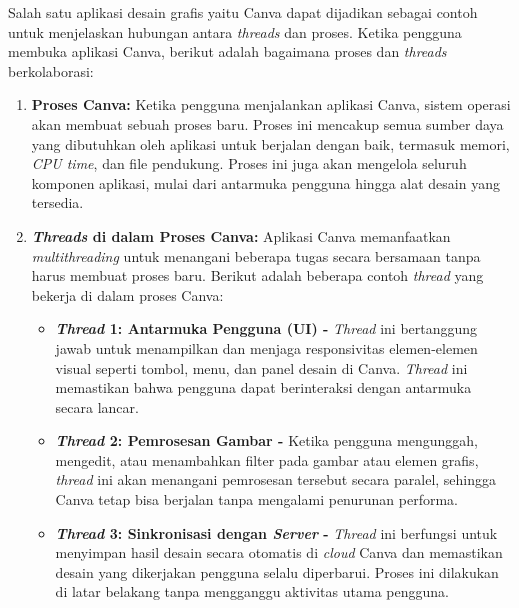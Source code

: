 \documentclass[12pt]{article}
\begin{document}
    \hspace{1cm}

    Salah satu aplikasi desain grafis yaitu Canva dapat dijadikan sebagai contoh untuk menjelaskan hubungan antara \textit{threads} dan proses. Ketika pengguna membuka aplikasi Canva, berikut adalah bagaimana proses dan \textit{threads} berkolaborasi:

    \begin{enumerate}
    
        \item \textbf{Proses Canva:} Ketika pengguna menjalankan aplikasi Canva, sistem operasi akan membuat sebuah proses baru. Proses ini mencakup semua sumber daya yang dibutuhkan oleh aplikasi untuk berjalan dengan baik, termasuk memori, \textit{CPU time}, dan file pendukung. Proses ini juga akan mengelola seluruh komponen aplikasi, mulai dari antarmuka pengguna hingga alat desain yang tersedia.
        
        \item \textbf{\textit{Threads} di dalam Proses Canva:} Aplikasi Canva memanfaatkan \textit{multithreading} untuk menangani beberapa tugas secara bersamaan tanpa harus membuat proses baru. Berikut adalah beberapa contoh \textit{thread} yang bekerja di dalam proses Canva:

        \begin{itemize}
        
            \item \textbf{\textit{Thread} 1: Antarmuka Pengguna (UI) -} \textit{Thread} ini bertanggung jawab untuk menampilkan dan menjaga responsivitas elemen-elemen visual seperti tombol, menu, dan panel desain di Canva. \textit{Thread} ini memastikan bahwa pengguna dapat berinteraksi dengan antarmuka secara lancar.
            
            \item \textbf{\textit{Thread} 2: Pemrosesan Gambar -} Ketika pengguna mengunggah, mengedit, atau menambahkan filter pada gambar atau elemen grafis, \textit{thread} ini akan menangani pemrosesan tersebut secara paralel, sehingga Canva tetap bisa berjalan tanpa mengalami penurunan performa.
            
            \item \textbf{\textit{Thread} 3: Sinkronisasi dengan \textit{Server} -} \textit{Thread} ini berfungsi untuk menyimpan hasil desain secara otomatis di \textit{cloud} Canva dan memastikan desain yang dikerjakan pengguna selalu diperbarui. Proses ini dilakukan di latar belakang tanpa mengganggu aktivitas utama pengguna.
            

\end{itemize}
\end{enumerate}
\end{document}
